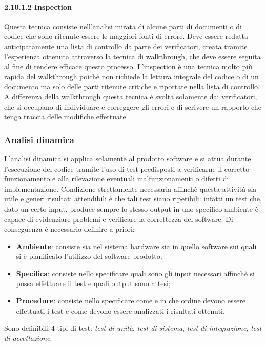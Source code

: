 \paragraph{2.10.1.2 Inspection}
Questa tecnica consiste nell'analisi mirata di alcune parti di documenti o di codice che sono ritenute essere le maggiori fonti di errore. Deve essere redatta anticipatamente una lista di controllo da parte dei verificatori, creata tramite l'esperienza ottenuta attraverso la tecnica di walkthrough, che deve essere seguita al fine di rendere efficace questo processo. L'inspection è una tecnica molto più rapida del walkthrough poichè non richiede la lettura integrale del codice o di un documento ma solo delle parti ritenute critiche e riportate nella lista di controllo. A differenza della walkthrough questa tecnica è svolta solamente dai verificatori, che si occupano di individuare e correggere gli errori e di scrivere un rapporto che tenga traccia delle modifiche effettuate.

\subsubsection{Analisi dinamica}
L'analisi dinamica si applica solamente al prodotto software e si attua durante l'esecuzione del codice tramite l'uso di test predisposti a verificarne il corretto funzionamento e alla rilevazione eventuali malfunzionamenti o difetti di implementazione.
Condizione strettamente necessaria affinchè questa attività sia utile e generi risultati attendibili è che tali test siano ripetibili: infatti un test che, dato un certo input, produce sempre lo stesso output in uno specifico ambiente è capace di evidenziare problemi e verificare la correttezza del software.
Di conseguenza è necessario definire a priori:
\begin{itemize}
	\item \textbf{Ambiente}: consiste sia nel sistema hardware sia in quello software sui quali si è pianificato l'utilizzo del software prodotto;
	\item \textbf{Specifica}: consiste nello specificare quali sono gli input necessari affinchè si possa effettuare il test e quali output sono attesi;
	\item \textbf{Procedure}: consiste nello specificare come e in che ordine devono essere effettuati i test e come devono essere analizzati i risultati ottenuti.
\end{itemize}

\noindent Sono definibili 4 tipi di test: \textit{test di unità}, \textit{test di sistema}, \textit{test di integrazione}, \textit{test di accettazione}.

